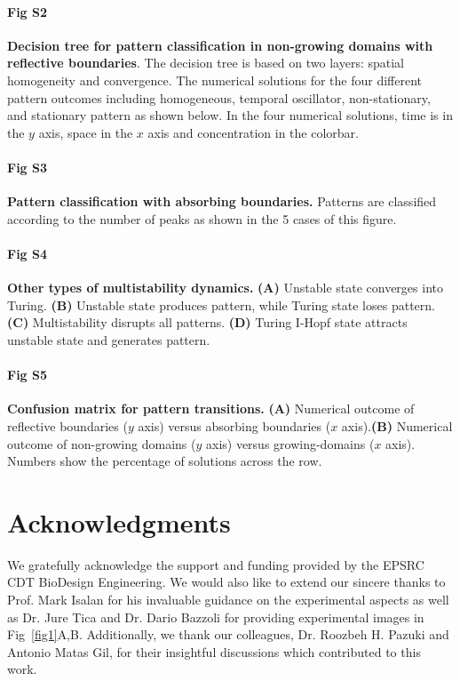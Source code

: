 \documentclass[10pt,letterpaper]{article}
\begin{document}
    
\paragraph*{Fig S2}
\label{sup_fig2}
{\bf Decision tree for pattern classification in non-growing domains with reflective boundaries}. The decision tree is based on two layers: spatial homogeneity and convergence. The numerical solutions for the four different pattern outcomes including  homogeneous, temporal oscillator, non-stationary, and stationary pattern as shown below. In the four numerical solutions, time is in the $y$ axis, space in the $x$ axis and concentration in the colorbar.

\paragraph*{Fig S3}
\label{sup_fig3}
{\bf Pattern classification with absorbing boundaries.} Patterns are classified according to the number of peaks as shown in the 5 cases of this figure.  %


\paragraph*{Fig S4}
\label{sup_fig4}
{\bf Other types of multistability dynamics.} \textbf{(A)} Unstable state converges into Turing. \textbf{(B)} Unstable state produces pattern, while Turing state loses pattern. \textbf{(C)} Multistability disrupts all patterns. \textbf{(D)} Turing I-Hopf state attracts unstable state and generates pattern.


\paragraph*{Fig S5}
\label{sup_fig5}
{\bf Confusion matrix for pattern transitions.} \textbf{(A)} Numerical outcome of reflective boundaries ($y$ axis) versus absorbing boundaries ($x$ axis).\textbf{(B)} Numerical outcome of non-growing domains ($y$ axis) versus growing-domains ($x$ axis). Numbers show the percentage of solutions across the row.


\section*{Acknowledgments}
We gratefully acknowledge the support and funding provided by the EPSRC CDT BioDesign Engineering. We would also like to extend our sincere thanks to Prof. Mark Isalan for his invaluable guidance on the experimental aspects as well as Dr. Jure Tica and Dr. Dario Bazzoli for providing experimental images in Fig~\ref{fig1}A,B. Additionally, we thank our colleagues, Dr. Roozbeh H. Pazuki
 and Antonio Matas Gil, for their insightful discussions which contributed to this work.
\end{document}
